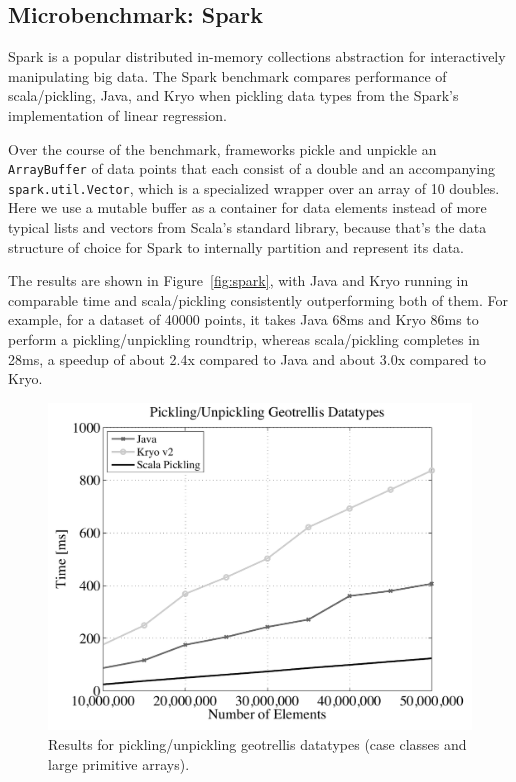 \documentclass[10pt]{sigplanconf}
\theoremstyle{definition}
\theoremstyle{definition}
\begin{document}
\subsection{Microbenchmark: Spark}

Spark is a popular distributed in-memory collections abstraction for interactively manipulating big data.
The Spark benchmark compares performance of scala/pickling, Java, and Kryo when pickling data types from the Spark's implementation of linear regression.

Over the course of the benchmark, frameworks pickle and unpickle an
\verb|ArrayBuffer| of data points that each consist of a double
and an accompanying \verb|spark.util.Vector|, which
is a specialized wrapper over an array of 10 doubles. Here we use a
mutable buffer as a container for data elements instead
of more typical lists and vectors from Scala's standard library,
because that's the data structure of choice for Spark
to internally partition and represent its data.

The results are shown in Figure~\ref{fig:spark}, with Java and Kryo
running in comparable time and scala/pickling consistently outperforming both of them. For example, for a dataset of 40000 points, it takes Java 68ms and Kryo 86ms to perform a pickling/unpickling roundtrip, whereas scala/pickling completes in 28ms, a speedup of about 2.4x compared to Java and about 3.0x compared to Kryo.

\begin{figure}[ht!]
 \centering
 \includegraphics[width=\columnwidth]{geotrellis.pdf}
 \caption{Results for pickling/unpickling geotrellis datatypes (case classes and large primitive arrays).}
 \label{fig:geotrellis}
\end{figure}
\end{document}
